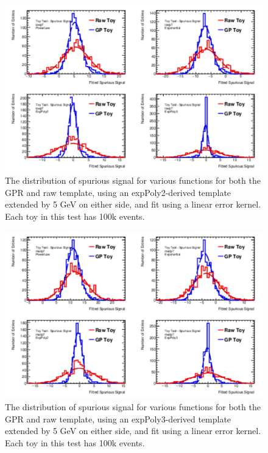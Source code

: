 \begin{figure} 
\begin{center}
  \includegraphics[width=\textwidth]{figures/background/gpr/validation/linear/ToyTest_FitSigVals_lowpT_100k_noSig}   
\caption{The distribution of spurious signal for various functions for both the GPR and raw template, using an expPoly2-derived template extended by 5 GeV on either side, and fit using a linear error kernel. Each toy in this test has 100k events.}
\label{fig:linearkernel_lowpt_100k_noSig}
\end{center}
\end{figure}

\begin{figure} 
\begin{center}
  \includegraphics[width=\textwidth]{figures/background/gpr/validation/linear/ToyTest_FitSigVals_medpT_100k_noSig}   
\caption{The distribution of spurious signal for various functions for both the GPR and raw template, using an expPoly3-derived template extended by 5 GeV on either side, and fit using a linear error kernel. Each toy in this test has 100k events.}
\label{fig:linearkernel_medpt_100k_noSig}
\end{center}
\end{figure}

